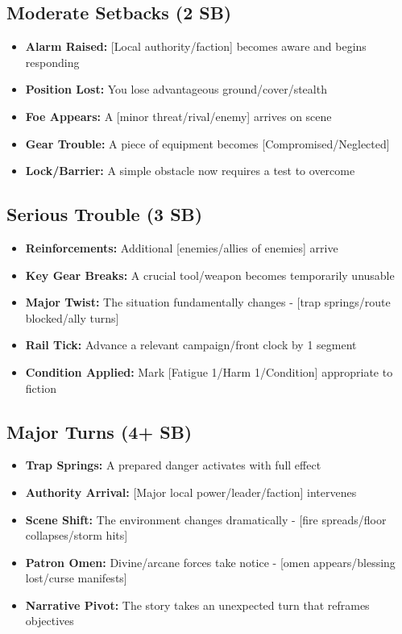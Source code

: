 \subsection*{Moderate Setbacks (2 SB)}
\begin{itemize}
\item \textbf{Alarm Raised:} [Local authority/faction] becomes aware and begins responding
\item \textbf{Position Lost:} You lose advantageous ground/cover/stealth
\item \textbf{Foe Appears:} A [minor threat/rival/enemy] arrives on scene
\item \textbf{Gear Trouble:} A piece of equipment becomes [Compromised/Neglected]
\item \textbf{Lock/Barrier:} A simple obstacle now requires a test to overcome
\end{itemize}

\subsection*{Serious Trouble (3 SB)}
\begin{itemize}
\item \textbf{Reinforcements:} Additional [enemies/allies of enemies] arrive
\item \textbf{Key Gear Breaks:} A crucial tool/weapon becomes temporarily unusable
\item \textbf{Major Twist:} The situation fundamentally changes - [trap springs/route blocked/ally turns]
\item \textbf{Rail Tick:} Advance a relevant campaign/front clock by 1 segment
\item \textbf{Condition Applied:} Mark [Fatigue 1/Harm 1/Condition] appropriate to fiction
\end{itemize}

\subsection*{Major Turns (4+ SB)}
\begin{itemize}
\item \textbf{Trap Springs:} A prepared danger activates with full effect
\item \textbf{Authority Arrival:} [Major local power/leader/faction] intervenes
\item \textbf{Scene Shift:} The environment changes dramatically - [fire spreads/floor collapses/storm hits]
\item \textbf{Patron Omen:} Divine/arcane forces take notice - [omen appears/blessing lost/curse manifests]
\item \textbf{Narrative Pivot:} The story takes an unexpected turn that reframes objectives
\end{itemize}

